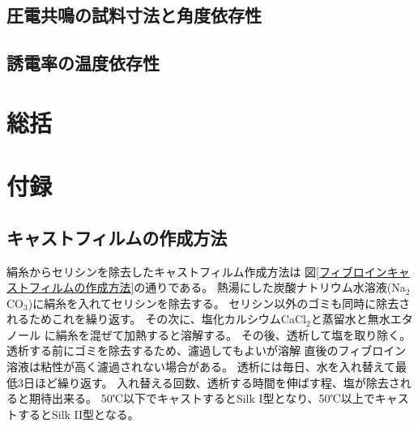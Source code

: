 \documentclass[dvipdfmx,12pt,a4paper]{jreport}
\begin{document}
			\section{圧電共鳴の試料寸法と角度依存性}
			\newpage
			\section{誘電率の温度依存性}
	\chapter{総括}
	\chapter{付録}
	\section{キャストフィルムの作成方法}
	絹糸からセリシンを除去したキャストフィルム作成方法は
	図\ref{フィブロインキャストフィルムの作成方法}の通りである。
	熱湯にした炭酸ナトリウム水溶液(Na$_2$CO$_3$)に絹糸を入れてセリシンを除去する。
	セリシン以外のゴミも同時に除去されるためこれを繰り返す。
	その次に、塩化カルシウムCaCl$_2$と蒸留水と無水エタノール
	に絹糸を混ぜて加熱すると溶解する。
	その後、透析して塩を取り除く。
	透析する前にゴミを除去するため、濾過してもよいが溶解
	直後のフィブロイン溶液は粘性が高く濾過されない場合がある。
	透析には毎日、水を入れ替えて最低3日ほど繰り返す。
	入れ替える回数、透析する時間を伸ばす程、塩が除去されると期待出来る。
	50℃以下でキャストするとSilk I型となり、50℃以上でキャストするとSilk II型となる。
\end{document}
